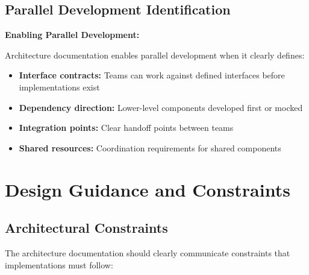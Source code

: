 \documentclass[11pt]{article}
\begin{document}
\subsection{Parallel Development Identification}

\begin{keypoint}
\textbf{Enabling Parallel Development:}

Architecture documentation enables parallel development when it clearly defines:

\begin{itemize}
    \item \textbf{Interface contracts:} Teams can work against defined interfaces before implementations exist
    \item \textbf{Dependency direction:} Lower-level components developed first or mocked
    \item \textbf{Integration points:} Clear handoff points between teams
    \item \textbf{Shared resources:} Coordination requirements for shared components
\end{itemize}
\end{keypoint}

\section{Design Guidance and Constraints}

\subsection{Architectural Constraints}

The architecture documentation should clearly communicate constraints that implementations must follow:
\end{document}
